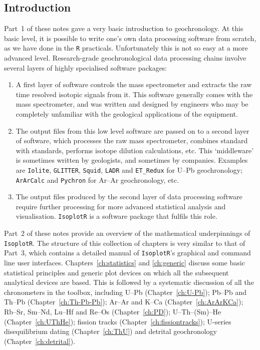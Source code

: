\begin{refsection}
\chapter{Introduction}
\label{ch:intro2}

Part~1 of these notes gave a very basic introduction to geochronology.
At this basic level, it is possible to write one's own data processing
software from scratch, as we have done in the \texttt{R} practicals.
Unfortunately this is not so easy at a more advanced level.
Research-grade geochronological data processing chains involve several
layers of highly specialised software packages:

\begin{enumerate}
\item A first layer of software controls the mass spectrometer and
  extracts the raw time resolved isotopic signals from it. This
  software generally comes with the mass spectrometer, and was written
  and designed by engineers who may be completely unfamiliar with the
  geological applications of the equipment.
\item The output files from this low level software are passed on to a
  second layer of software, which processes the raw mass spectrometer,
  combines standard with standards, performs isotope dilution
  calculations, etc. This `middleware' is sometimes written by
  geologists, and sometimes by companies. Examples are
  \texttt{Iolite}, \texttt{GLITTER}, \texttt{Squid}, \texttt{LADR} and
  \texttt{ET\_Redux} for U--Pb geochronology; \texttt{ArArCalc} and
  \texttt{Pychron} for Ar--Ar geochronology, etc.
\item The output files produced by the second layer of data processing
  software require further processing for more advanced statistical
  analysis and visualisation. \texttt{IsoplotR} is a software package
  that fulfils this role.
\end{enumerate}

Part~2 of these notes provide an overview of the mathematical
underpinnings of \texttt{IsoplotR}. The structure of this collection
of chapters is very similar to that of Part~3, which contains a
detailed manual of \texttt{IsoplotR}'s graphical and command line user
interfaces. Chapters~\ref{ch:statistics} and \ref{ch:generic} discuss
some basic statistical principles and generic plot devices on which
all the subsequent analytical devices are based. This is followed by a
systematic discussion of all the chronometers in the toolbox,
including U--Pb (Chapter~\ref{ch:U-Pb}); Pb--Pb and Th--Pb
(Chapter~\ref{ch:Th-Pb-Pb}); Ar--Ar and K--Ca
(Chapter~\ref{ch:ArArKCa}); Rb--Sr, Sm--Nd, Lu--Hf and Re--Os
(Chapter~\ref{ch:PD}); U--Th--(Sm)--He (Chapter~\ref{ch:UThHe});
fission tracks (Chapter~\ref{ch:fissiontracks}); U-series
disequilibrium dating (Chapter~\ref{ch:ThU}) and detrital
geochronology (Chapter~\ref{ch:detrital}).


\end{refsection}
